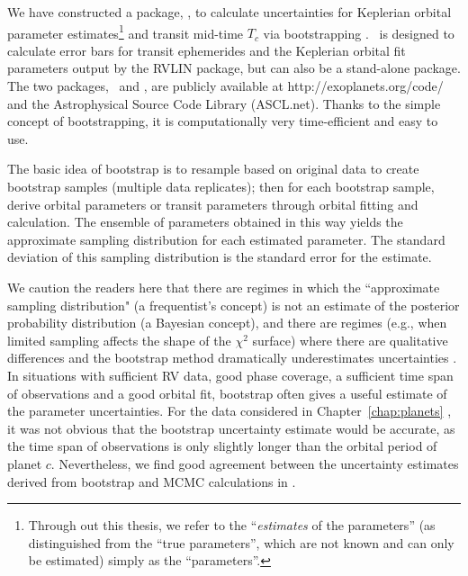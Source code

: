 We have constructed a package, \boottran, to calculate uncertainties
for Keplerian orbital parameter estimates\footnote{Through out this
  thesis, we refer to the ``{\it estimates} of the parameters'' (as
  distinguished from the ``true parameters'', which are not known and
  can only be estimated) simply as the ``parameters''.} and transit
mid-time $T_c$ via bootstrapping
\citep{1981,davison1997bootstrap}. \boottran\ is designed to calculate
error bars for transit ephemerides and the Keplerian orbital fit
parameters output by the RVLIN package\citep{rvlin}, but can also be a
stand-alone package. The two packages, \rvlin\ and \boottran, are
publicly available at http://exoplanets.org/code/ and the
Astrophysical Source Code Library (ASCL.net). Thanks to the simple
concept of bootstrapping, it is computationally very time-efficient
and easy to use.

The basic idea of bootstrap is to resample based on original data
to create bootstrap samples (multiple data replicates); then for
each bootstrap sample, derive orbital parameters or transit parameters
through orbital fitting and calculation. The ensemble of parameters
obtained in this way yields the approximate sampling distribution for
each estimated parameter. The standard deviation of this sampling
distribution is the standard error for the estimate.

We caution the readers here that there are regimes in which the
``approximate sampling distribution" (a frequentist's concept) is not
an estimate of the posterior probability distribution (a Bayesian
concept), and there are regimes (e.g., when limited sampling affects
the shape of the $\chi^2$ surface) where there are qualitative
differences and the bootstrap method dramatically underestimates
uncertainties \citep[e.g., long-period planets when the observations
  are not yet sufficient to pin down the orbital
  period;][]{Ford2005,Bender2012}. In situations with sufficient RV
data, good phase coverage, a sufficient time span of observations and
a good orbital fit, bootstrap often gives a useful estimate of the
parameter uncertainties. For the data considered in
Chapter~\ref{chap:planets} \citep{wang2012}, it was not obvious that
the bootstrap uncertainty estimate would be accurate, as the time span
of observations is only slightly longer than the orbital period of
planet $c$. Nevertheless, we find good agreement between the
uncertainty estimates derived from bootstrap and MCMC calculations in
\cite{wang2012}.

